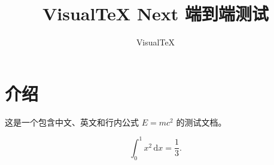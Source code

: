 \documentclass{ctexart}\usepackage{zref-savepos,zref-abspage}\makeatletter\zref@addprop{savepos}{abspage}\makeatother
\title{VisualTeX Next 端到端测试}
\author{VisualTeX}
\begin{document}
\maketitle

\section{介绍}
这是一个包含中文、英文和行内公式 $E=mc^2$ 的测试文档。

\begin{equation}
  \int_0^1 x^2\,\mathrm{d}x = \frac{1}{3}.
\end{equation}
\end{document}
